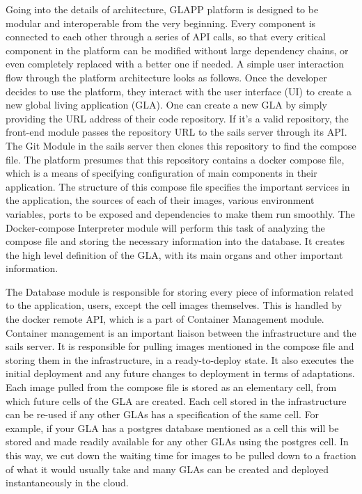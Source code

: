 \documentclass{seal_thesis}
\begin{document}
Going into the details of architecture, GLAPP platform is designed to be modular and interoperable from the very beginning. 
Every component is connected to each other through a series of API calls, so that every critical component in the platform can be modified without large dependency chains, or even completely replaced with a better one if needed.
A simple user interaction flow through the platform architecture looks as follows. 
Once the developer decides to use the platform, they interact with the user interface (UI) to create a new global living application (GLA). 
One can create a new GLA by simply providing the URL address of their code repository. 
If it's a valid repository, the front-end module passes the repository URL to the sails server through its API. 
The Git Module in the sails server then clones this repository to find the compose file. 
The platform presumes that this repository contains a docker compose file, which is a means of specifying configuration of main components in their application. 
The structure of this compose file specifies the important services in the application, the sources of each of their images, various environment variables, ports to be exposed and dependencies to make them run smoothly. 
The Docker-compose Interpreter module will perform this task of analyzing the compose file and storing the necessary information into the database. 
It creates the high level definition of the GLA, with its main organs and other important information.

The Database module is responsible for storing every piece of information related to the application, users, except the cell images themselves. 
This is handled by the docker remote API, which is a part of Container Management module.
Container management is an important liaison between the infrastructure and the sails server. 
It is responsible for pulling images mentioned in the compose file and storing them in the infrastructure, in a ready-to-deploy state. 
It also executes the initial deployment and any future changes to deployment in terms of adaptations. 
Each image pulled from the compose file is stored as an elementary cell, from which future cells of the GLA are created. 
Each cell stored in the infrastructure can be re-used if any other GLAs has a specification of the same cell. 
For example, if your GLA has a postgres database mentioned as a cell this will be stored and made readily available for any other GLAs using the postgres cell. 
In this way, we cut down the waiting time for images to be pulled down to a fraction of what it would usually take and many GLAs can be created and deployed instantaneously in the cloud.
\end{document}
